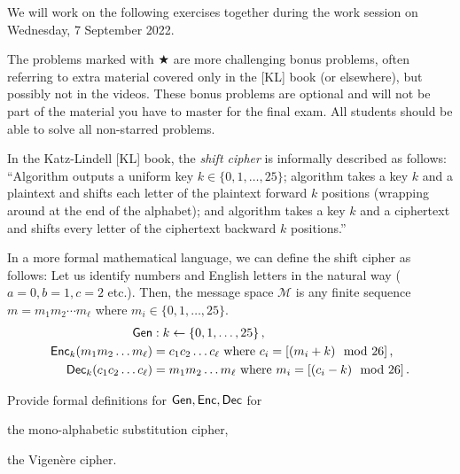\documentclass[a4paper,10pt,landscape,twocolumn]{scrartcl}
\begin{document}
\problems

{\sffamily\noindent
We will work on the following exercises together during the work session on Wednesday, 7 September 2022.

The problems marked with $\bigstar$ are more challenging bonus problems, often referring to extra material covered only in the [KL] book (or elsewhere), but possibly not in the videos. These bonus problems are optional and will not be part of the material you have to master for the final exam. All students should be able to solve all non-starred problems.
}

\begin{exercise}
In the Katz-Lindell [KL] book, the \emph{shift cipher} is informally described as follows: ``Algorithm \gen outputs a uniform key $k \in \{0,1,\ldots, 25\}$; algorithm \enc takes a key $k$ and a plaintext and shifts each letter of the plaintext forward $k$ positions (wrapping around at the end of the alphabet); and algorithm \dec takes a key $k$ and a ciphertext and shifts every letter of the ciphertext backward $k$ positions.''

In a more formal mathematical language, we can define the shift cipher as follows: Let us identify numbers and English letters in the natural way ($a=0, b=1, c=2$ etc.). Then, the message space $\mathcal{M}$ is any finite sequence $m=m_1 m_2 \cdots m_\ell$ where $m_i \in \{0,1,\ldots,25\}$.
\begin{align*}
\mathsf{Gen}&: k \leftarrow \{0,1,\ldots, 25\} \, ,\\
\mathsf{Enc}_k(m_1 m_2 \ldots m_\ell) &= c_1 c_2 \ldots c_\ell  \mbox{ where }c_i = [(m_i + k) \mod 26] \, ,\\
\mathsf{Dec}_k(c_1 c_2 \ldots c_\ell) &= m_1 m_2 \ldots m_\ell  \mbox{ where }m_i = [(c_i - k) \mod 26] \, .
\end{align*}

Provide formal definitions for $\mathsf{Gen}, \mathsf{Enc}, \mathsf{Dec}$ for
\begin{subex}
the mono-alphabetic substitution cipher,
\end{subex}
\begin{subex}
the Vigen{\`e}re cipher.
\end{subex}
\end{exercise}
\end{document}
